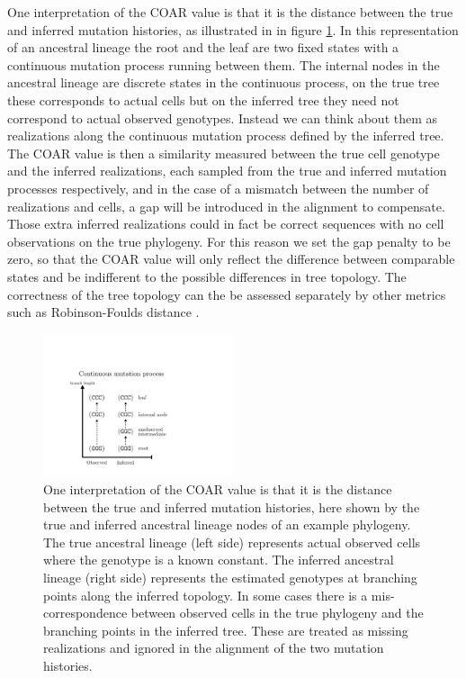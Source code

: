 One interpretation of the COAR value is that it is the distance between the true and inferred mutation histories, as illustrated in in figure \ref{fig:mutation_process}.
In this representation of an ancestral lineage the root and the leaf are two fixed states with a continuous mutation process running between them.
The internal nodes in the ancestral lineage are discrete states in the continuous process, on the true tree these corresponds to actual cells but on the inferred tree they need not correspond to actual observed genotypes.
Instead we can think about them as realizations along the continuous mutation process defined by the inferred tree.
The COAR value is then a similarity measured between the true cell genotype and the inferred realizations, each sampled from the true and inferred mutation processes respectively, and in the case of a mismatch between the number of realizations and cells, a gap will be introduced in the alignment to compensate.
Those extra inferred realizations could in fact be correct sequences with no cell observations on the true phylogeny.
For this reason we set the gap penalty to be zero, so that the COAR value will only reflect the difference between comparable states and be indifferent to the possible differences in tree topology.
The correctness of the tree topology can the be assessed separately by other metrics such as Robinson-Foulds distance \cite{robinson1981comparison}.

\clearpage
\begin{figure}[ht!]
    \centering
    \includegraphics[width=0.5\textwidth]{figures/mutation_process2.pdf}
    \caption{
        \label{fig:mutation_process}
        One interpretation of the COAR value is that it is the distance between the true and inferred mutation histories, here shown by the true and inferred ancestral lineage nodes of an example phylogeny.
        The true ancestral lineage (left side) represents actual observed cells where the genotype is a known constant.
        The inferred ancestral lineage (right side) represents the estimated genotypes at branching points along the inferred topology.
        In some cases there is a mis-correspondence between observed cells in the true phylogeny and the branching points in the inferred tree.
        These are treated as missing realizations and ignored in the alignment of the two mutation histories.
    }
\end{figure}





